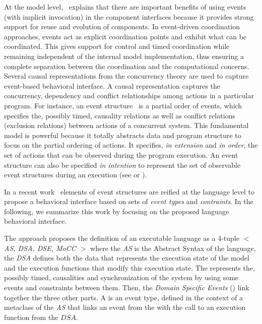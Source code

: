 At the model level,~\cite{garlansoftarchbib} explains that there are important benefits of using events (with implicit invocation) in the component interfaces because it provides strong support for reuse and evolution of components. In event-driven coordination approaches, events act as explicit coordination points and exhibit what can be coordinated. This gives support for control and timed coordination while remaining independent of the internal model implementation, thus ensuring a complete separation between the coordination and the computational concerns. Several causal representations from the concurrency theory are used to capture event-based behavioral interface. A causal representation captures the concurrency, dependency and conflict relationships among actions in a particular program. For instance, an event structure~\cite{eventStructures} is a partial order of events, which specifies the, possibly timed, causality relations as well as conflict relations (\ie exclusion relations) between actions of a concurrent system. This fundamental model is powerful because it totally abstracts data and program structure to focus on the partial ordering of actions. It specifies, \emph{in extension} and \emph{in order}, the set of actions that can be observed during the program execution. An event structure can also be specified \emph{in intention} to represent the set of observable event structures during an execution (see \eg\cite{ccslbib} or \cite{tagmachinebib}).

In a recent work~\cite{sle13-combemale} elements of event structures are reified at the language level to propose a behavioral interface based on sets of \emph{event types} and \emph{contraints}. In the following, we summarize this work by focusing on the proposed language behavioral interface. 

The approach proposes the definition of an executable language as a 4-tuple \emph{$<$ AS, DSA, DSE, MoCC $>$} where the \emph{AS} is the Abstract Syntax of the language, the \emph{DSA} defines both the data that represents the execution state of the model and the execution functions that modify this execution state. The \mocc represents the, possibly timed, causalities and synchronization of the system by using some events and constraints between them. Then, the \emph{Domain Specific Events} (\dse) link together the three other parts. A \dse is an event type, defined in the context of a metaclass of the \emph{AS} that links an event from the \mocc with the call to an execution function from the $DSA$. 

